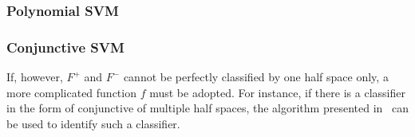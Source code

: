 \subsubsection{Polynomial SVM}

\subsubsection{Conjunctive SVM}


If, however, $F^+$ and $F^-$ cannot be perfectly classified by one half space only, 
a more complicated function $f$ must be adopted. 
For instance, if there is a classifier in the form of conjunctive of multiple half spaces, 
the algorithm presented in~\cite{Sharma2012} can be used to identify such a classifier.




